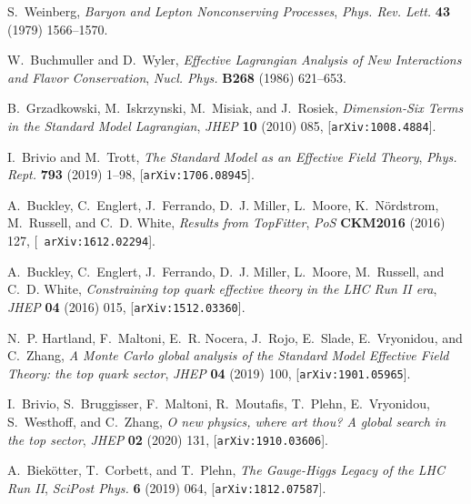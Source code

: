 \documentclass[11pt,a4paper]{article}
\numberwithin{equation}{section}
\numberwithin{figure}{section}
\numberwithin{table}{section}
\begin{document}
\providecommand{\href}[2]{#2}\begingroup\raggedright\begin{thebibliography}{100}

S.~Weinberg, {\it {Baryon and Lepton Nonconserving Processes}},  {\em Phys.
  Rev. Lett.} {\bf 43} (1979) 1566--1570.

W.~Buchmuller and D.~Wyler, {\it {Effective Lagrangian Analysis of New
  Interactions and Flavor Conservation}},  {\em Nucl. Phys.} {\bf B268} (1986)
  621--653.

B.~Grzadkowski, M.~Iskrzynski, M.~Misiak, and J.~Rosiek, {\it {Dimension-Six
  Terms in the Standard Model Lagrangian}},  {\em JHEP} {\bf 10} (2010) 085,
  [\href{http://arxiv.org/abs/1008.4884}{{\tt arXiv:1008.4884}}].

I.~Brivio and M.~Trott, {\it {The Standard Model as an Effective Field
  Theory}},  {\em Phys. Rept.} {\bf 793} (2019) 1--98,
  [\href{http://arxiv.org/abs/1706.08945}{{\tt arXiv:1706.08945}}].

A.~Buckley, C.~Englert, J.~Ferrando, D.~J. Miller, L.~Moore, K.~N{\"o}rdstrom,
  M.~Russell, and C.~D. White, {\it {Results from TopFitter}},  {\em PoS} {\bf
  CKM2016} (2016) 127, [\href{http://arxiv.org/abs/1612.02294}{{\tt
  arXiv:1612.02294}}].

A.~Buckley, C.~Englert, J.~Ferrando, D.~J. Miller, L.~Moore, M.~Russell, and
  C.~D. White, {\it {Constraining top quark effective theory in the LHC Run II
  era}},  {\em JHEP} {\bf 04} (2016) 015,
  [\href{http://arxiv.org/abs/1512.03360}{{\tt arXiv:1512.03360}}].

N.~P. Hartland, F.~Maltoni, E.~R. Nocera, J.~Rojo, E.~Slade, E.~Vryonidou, and
  C.~Zhang, {\it {A Monte Carlo global analysis of the Standard Model Effective
  Field Theory: the top quark sector}},  {\em JHEP} {\bf 04} (2019) 100,
  [\href{http://arxiv.org/abs/1901.05965}{{\tt arXiv:1901.05965}}].

I.~Brivio, S.~Bruggisser, F.~Maltoni, R.~Moutafis, T.~Plehn, E.~Vryonidou,
  S.~Westhoff, and C.~Zhang, {\it {O new physics, where art thou? A global
  search in the top sector}},  {\em JHEP} {\bf 02} (2020) 131,
  [\href{http://arxiv.org/abs/1910.03606}{{\tt arXiv:1910.03606}}].

A.~Biekötter, T.~Corbett, and T.~Plehn, {\it {The Gauge-Higgs Legacy of the
  LHC Run II}},  {\em SciPost Phys.} {\bf 6} (2019) 064,
  [\href{http://arxiv.org/abs/1812.07587}{{\tt arXiv:1812.07587}}].


\end{thebibliography}
\end{document}
